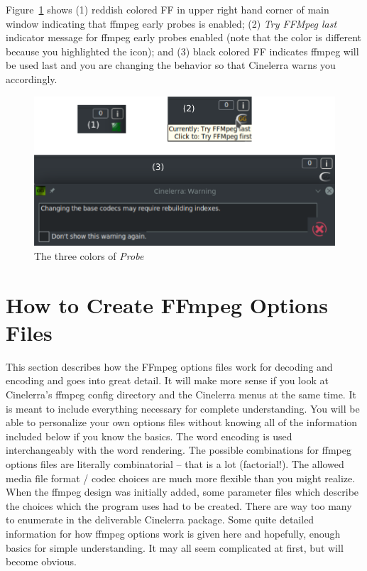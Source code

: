 Figure~\ref{fig:ff} shows (1) reddish colored FF in upper right hand corner of main window indicating
that ffmpeg early probes is enabled; (2) \textit{Try FFMpeg last}  indicator message for ffmpeg early probes enabled (note that the color is different because you highlighted the icon); and (3) black colored FF indicates ffmpeg will be used last and you are changing the behavior so that Cinelerra warns you accordingly.

\begin{figure}[htpb]
    \centering
    \includegraphics[width=0.7\linewidth]{images/ff.png}
    \caption{The three colors of \textit{Probe}}
    \label{fig:ff}
\end{figure}

\section{How to Create FFmpeg Options Files}%
\label{sec:create_ffmpeg_options_files}

This section describes how the FFmpeg options files work for decoding and encoding and goes into great detail.  It will make more sense if you look at Cinelerra's ffmpeg config directory and the Cinelerra menus at the same time.  
It is meant to include everything necessary for complete understanding.  You will be able to personalize your own options files without knowing all of the information included below if you know the basics.  The word encoding is used interchangeably with the word rendering.
The possible combinations for ffmpeg options files are literally combinatorial -- that is a lot (factorial!).  The allowed media file format / codec choices are much more flexible than you might realize.  When the ffmpeg design was initially added, some parameter files which describe the choices which the program uses had to be created.  There are way too many to enumerate in the deliverable Cinelerra package.  Some quite detailed information for how ffmpeg options work is given here and hopefully, enough basics for simple understanding.  It may all seem complicated at first, but will become obvious.

